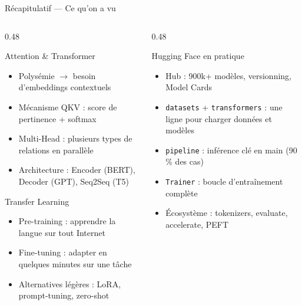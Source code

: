 \documentclass[aspectratio=169, 10pt]{beamer}
\begin{document}
\begin{frame}{Récapitulatif --- Ce qu'on a vu}
  \begin{columns}[T]
    \begin{column}{0.48\textwidth}
      \begin{block}{Attention \& Transformer}
        \begin{itemize}\small
          \item Polysémie $\to$ besoin d'embeddings contextuels
          \item Mécanisme QKV : score de pertinence + softmax
          \item Multi-Head : plusieurs types de relations en parallèle
          \item Architecture : Encoder (BERT), Decoder (GPT),
                Seq2Seq (T5)
        \end{itemize}
      \end{block}
      \vspace{4pt}
      \begin{block}{Transfer Learning}
        \begin{itemize}\small
          \item Pre-training : apprendre la langue sur tout Internet
          \item Fine-tuning : adapter en quelques minutes sur une tâche
          \item Alternatives légères : LoRA, prompt-tuning, zero-shot
        \end{itemize}
      \end{block}
    \end{column}
    \begin{column}{0.48\textwidth}
      \begin{block}{Hugging Face en pratique}
        \begin{itemize}\small
          \item Hub : 900k+ modèles, versionning, Model Cards
          \item \texttt{datasets} + \texttt{transformers} : une ligne
                pour charger données et modèles
          \item \texttt{pipeline} : inférence clé en main (90\,\% des cas)
          \item \texttt{Trainer} : boucle d'entraînement complète
          \item Écosystème : tokenizers, evaluate, accelerate, PEFT
        \end{itemize}
      \end{block}

\end{column}
\end{columns}
\end{frame}
\end{document}

